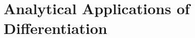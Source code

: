 \documentclass[../abcalc.tex]{subfiles}
\begin{document}
\chapter{Analytical Applications of Differentiation}
\end{document}
